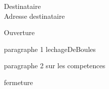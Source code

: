 \documentclass[12pt, a4paper]{lettre}
\makeatletter
\newcommand*{\noRule}{\renewcommand*{\rule@length}{0}}
\makeatother
\begin{document}
    
    \begin{letter}{Destinataire\\Adresse destinataire}
        \nolieu
        \nodate
        \noRule
        
        
        \opening{Ouverture}
            paragraphe 1 lechageDeBoules
            
            \vspace{2em}
            
            paragraphe 2 sur les competences
        
        \closing{fermeture}
    \end{letter}
    
\end{document}
